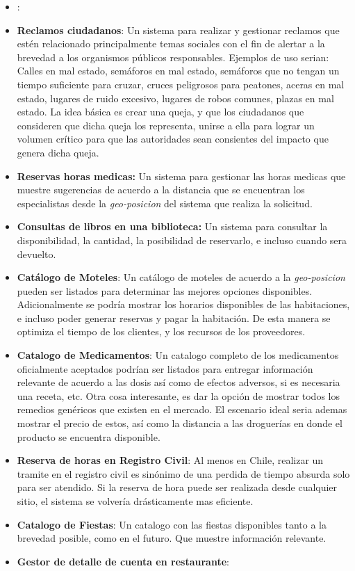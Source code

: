 \begin{itemize}
	\item \textbf{\shoppingCart}:
	
	\item \textbf{Reclamos ciudadanos}: Un sistema para realizar y gestionar reclamos que estén relacionado principalmente temas sociales con el fin de alertar a la brevedad a los organismos públicos responsables. Ejemplos de uso serian: Calles en mal estado, semáforos en mal estado, semáforos que no tengan un tiempo suficiente para cruzar, cruces peligrosos para peatones, aceras en mal estado, lugares de ruido excesivo, lugares de robos comunes, plazas en mal estado. La idea básica es crear una queja, y que los ciudadanos que consideren que dicha queja los representa, unirse a ella para lograr un volumen crítico para que las autoridades sean consientes del impacto que genera dicha queja.
	
	\item \textbf{Reservas horas medicas:} Un sistema para gestionar las horas medicas que muestre sugerencias de acuerdo a la distancia que se encuentran los especialistas desde la \textit{geo-posicion} del sistema que realiza la solicitud. 
	
	\item \textbf{Consultas de libros en una biblioteca:} Un sistema para consultar la disponibilidad, la cantidad, la posibilidad de reservarlo, e incluso cuando sera devuelto.
	\item \textbf{Catálogo de Moteles}: Un catálogo de moteles de acuerdo a la \textit{geo-posicion} pueden ser listados para determinar las mejores opciones disponibles. Adicionalmente se podría mostrar los horarios disponibles de las habitaciones, e incluso poder generar reservas y pagar la habitación. De esta manera se optimiza el tiempo de los clientes, y los recursos de los proveedores.
	
	\item \textbf{Catalogo de Medicamentos}: Un catalogo completo de los medicamentos oficialmente aceptados podrían ser listados para entregar información relevante de acuerdo a las dosis así como de efectos adversos, si es necesaria una receta, etc. Otra cosa interesante, es dar la opción de mostrar todos los remedios genéricos que existen en el mercado. El escenario ideal seria ademas mostrar el precio de estos, así como la distancia a las droguerías en donde el producto se encuentra disponible.
	
	\item \textbf{Reserva de horas en Registro Civil}: Al menos en Chile, realizar un tramite en el registro civil es sinónimo de una perdida de tiempo absurda solo para ser atendido. Si la reserva de hora puede ser realizada desde cualquier sitio, el sistema se volvería drásticamente mas eficiente.
	
	\item \textbf{Catalogo de Fiestas}: Un catalogo con las fiestas disponibles tanto a la brevedad posible, como en el futuro. Que muestre información relevante.
	
	\item \textbf{Gestor de detalle de cuenta en restaurante}: 
	
\end{itemize}

